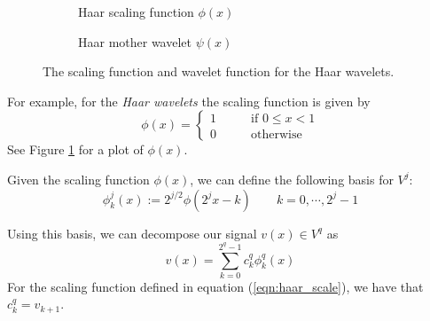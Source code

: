 \begin{figure}
  \centering
  \begin{subfigure}{0.4\textwidth}
    \centering
    \caption{Haar scaling function $\phi(x)$}
    \label{fig:haar_scaling}
  \end{subfigure}
  \begin{subfigure}{0.4\textwidth}
    \centering
    \caption{Haar mother wavelet $\psi(x)$}
    \label{fig:haar_mother}
  \end{subfigure}
  \caption{The scaling function and wavelet function for the Haar wavelets.}
  \label{fig:haar_1d}
\end{figure}

For example, for the \emph{Haar wavelets} the scaling function is given by
\begin{equation}
  \label{eqn:haar_scale}
  \phi(x) = \left\{ \begin{array}{rl}
    1& \qquad \mbox{if $0\leq x < 1$}\\
    0& \qquad \mbox{otherwise}
  \end{array}\right.
\end{equation}
See Figure \ref{fig:haar_scaling} for a plot of $\phi(x)$.

Given the scaling function $\phi(x)$, we can define the following basis for $V^j$:
\begin{equation*}
  \phi_k^j(x) := 2^{j/2}\phi(2^j x-k) \qquad k = 0,\cdots, 2^j-1
\end{equation*}

Using this basis, we can decompose our signal $v(x)\in V^q$ as 
\begin{equation*}
  v(x) = \sum_{k=0}^{2^q-1} c_k^q \phi_k^q(x)
\end{equation*}
For the scaling function defined in equation (\ref{eqn:haar_scale}), we have that $c_k^q = v_{k+1}$.

